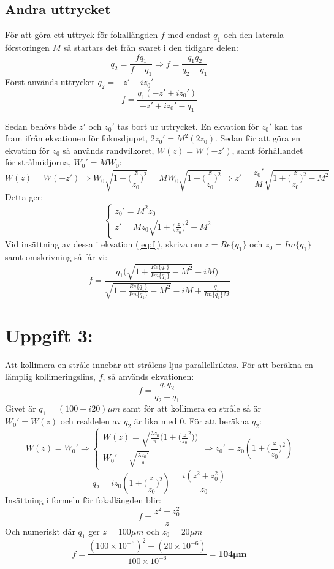 \documentclass{article}
\begin{document}
  \subsection*{Andra uttrycket}
    För att göra ett uttryck för fokallängden $f$ med endast $q_1$ och den laterala förstoringen $M$ så startars det från svaret i den tidigare delen:
    \[
      q_2=\frac{fq_1}{f-q_1}\Longrightarrow f=\frac{q_1q_2}{q_2-q_1}
    \]
    Först används uttrycket $q_2=-z'+iz_0'$
    \begin{equation}
      f=\frac{q_1(-z'+iz_0')}{-z'+iz_0'-q_1}
      \label{eq:f}
    \end{equation}

    Sedan behövs både $z'$ och $z_0'$ tas bort ur uttrycket. En ekvation för $z_0'$ kan tas fram ifrån ekvationen för fokusdjupet, $2z_0'=M^2(2z_0)$. Sedan för att göra en ekvation för $z_0$ så används randvilkoret, $W(z)=W(-z')$, samt förhållandet för strålmidjorna, $W_0'=MW_0$:
    \[
      W(z)=W(-z')\Rightarrow W_0\sqrt{1+\big(\frac{z}{z_0}\big)^2}=MW_0\sqrt{1+\big(\frac{z}{z_0}\big)^2}\Rightarrow z'=\frac{z_0'}{M}\sqrt{1+\big(\frac{z}{z_0}\big)^2-M^2}
    \]
    Detta ger:
    \[
      \begin{cases}
        z_0'=M^2z_0\\
        z'=Mz_0\sqrt{1+\big(\frac{z}{z_0}\big)^2-M^2}
      \end{cases}
    \]
    Vid insättning av dessa i ekvation (\ref{eq:f}), skriva om $z=Re\{q_1\}$ och $z_0=Im\{q_1\}$ samt omskrivning så får vi:
    \[
      f=\frac{q_1\big(\sqrt{1+\frac{Re\{q_1\}}{Im\{q_1\}}-M^2}-iM\big)}{\sqrt{1+\frac{Re\{q_1\}}{Im\{q_1\}}-M^2}-iM+\frac{q_1}{Im\{q_1\}M}}
    \]

\newpage
\section*{Uppgift 3:}
  Att kollimera en stråle innebär att strålens ljus parallellriktas. För att beräkna en lämplig kollimeringslins, $f$, så används ekvationen:
  \[
    f=\frac{q_1q_2}{q_2-q_1}
  \]
  Givet är $q_1=(100+i20)\mu m$ samt för att kollimera en stråle så är $W_0'=W(z)$ och realdelen av $q_2$ är lika med $0$. För att beräkna $q_2$:
  \[
    W(z)=W_0'\Rightarrow
    \begin{cases}
      W(z)=\sqrt{\frac{\lambda z_0}{\pi}\bigg(1+\big(\frac{z}{z_0}^2\big)\bigg)}\\
      W_0'=\sqrt{\frac{\lambda z_0'}{\pi}}
    \end{cases}
    \Rightarrow z_0'=z_0(1+\big(\frac{z}{z_0}\big)^2)
  \]
  \[
    q_2=iz_0(1+\big(\frac{z}{z_0}\big)^2)=\frac{i(z^2+z_0^2)}{z_0}
  \]
  Insättning i formeln för fokallängden blir:
  \[
    f=\frac{z^2+z_0^2}{z}
  \]
  Och numeriskt där $q_1$ ger $z=100\mu m$ och $z_0=20\mu m$
  \[
    f=\frac{(100\times10^{-6})^2+(20\times10^{-6})}{100\times10^{-6}}=\mathbf{104\mu m}
  \]
\end{document}
